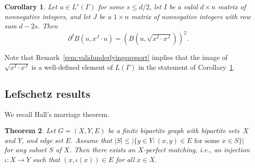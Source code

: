 \documentclass[11pt]{article}
\newtheorem{theo}{Theorem}[section]
\newtheorem{coro}[theo]{Corollary}
\theoremstyle{definition}
\numberwithin{equation}{section}
\numberwithin{equation}{section}
\begin{document}
\begin{coro}\label{cor:KXidentity}
Let $u \in L^s(\Gamma)$ for some $s \le d/2$, 
let $I$ be a valid $d \times n$ matrix of nonnegative integers, and   let $J$ be a $1 \times n$  matrix of nonnegative integers  with row sum $d - 2s$.
Then
$$\partial^I B(u, x^J \cdot u) = (B(u, \sqrt{x^I \cdot x^J}))^2.$$
\end{coro}

Note that Remark~\ref{rem:validunderlyingsupport} implies that the image of $\sqrt{x^I \cdot x^J}$ is a well-defined element of $L(\Gamma)$ in the statement of Corollary~\ref{cor:KXidentity}. 

\subsection{Lefschetz results}

We recall Hall's marriage theorem. 

\begin{theo}\label{thm:Hall}\cite{HallRepresentativesSubsets}
	Let $G = (X,Y,E)$ be a finite bipartite graph with bipartite sets~$X$ and $Y$, and edge set $E$. Assume that 
	$|S| \le |\{ y \in Y : (x,y) \in E \textrm{ for some } x \in S \}|$ for any subset $S$ of $X$.
	Then there exists an $X$-perfect matching, i.e., an injection $\iota\colon X \to Y$ such that $(x,\iota(x)) \in E$ for all $x \in X$. 
\end{theo}
\end{document}
